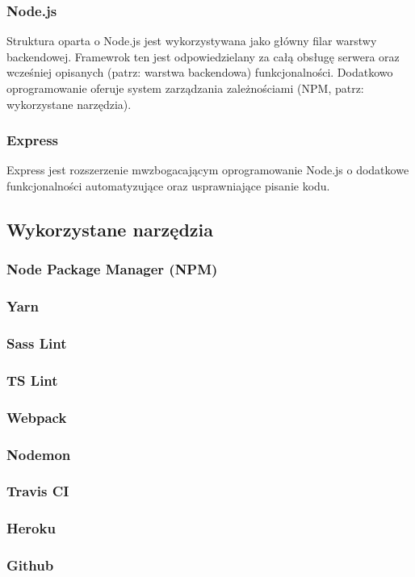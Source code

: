 \documentclass[eng,printmode]{mgr}
\begin{document}
\subsubsection{Node.js}
Struktura oparta o Node.js \cite {Node.js} jest wykorzystywana jako główny filar warstwy backendowej. Framewrok ten jest odpowiedzielany za całą obsługę serwera oraz wcześniej opisanych (patrz: warstwa backendowa) funkcjonalności. Dodatkowo oprogramowanie oferuje system zarządzania zależnościami (NPM, patrz: wykorzystane narzędzia).
\subsubsection{Express}
Express \cite {Express} jest rozszerzenie mwzbogacającym oprogramowanie Node.js o dodatkowe funkcjonalności automatyzujące oraz usprawniające pisanie kodu.
\subsection{Wykorzystane narzędzia}
\subsubsection{Node Package Manager (NPM)}
\subsubsection{Yarn}
\subsubsection{Sass Lint}
\subsubsection{TS Lint}
\subsubsection{Webpack}
\subsubsection{Nodemon}
\subsubsection{Travis CI}
\subsubsection{Heroku}
\subsubsection{Github}
\end{document}
